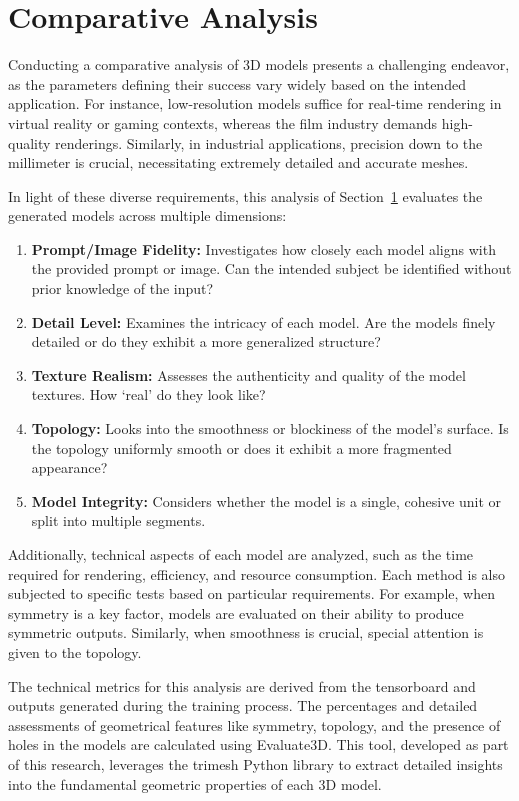 \section{Comparative Analysis}\label{comparativeAnalysis}

Conducting a comparative analysis of 3D models presents a challenging endeavor, as the parameters defining their success vary widely based on the intended application. For instance, low-resolution models suffice for real-time rendering in virtual reality or gaming contexts, whereas the film industry demands high-quality renderings. Similarly, in industrial applications, precision down to the millimeter is crucial, necessitating extremely detailed and accurate meshes.

In light of these diverse requirements, this analysis of Section~\ref{comparativeAnalysis} evaluates the generated models across multiple dimensions:

\begin{enumerate}
    \item \textbf{Prompt/Image Fidelity:} Investigates how closely each model aligns with the provided prompt or image. Can the intended subject be identified without prior knowledge of the input?
    \item \textbf{Detail Level:} Examines the intricacy of each model. Are the models finely detailed or do they exhibit a more generalized structure?
    \item \textbf{Texture Realism:} Assesses the authenticity and quality of the model textures. How `real' do they look like?
    \item \textbf{Topology:} Looks into the smoothness or blockiness of the model's surface. Is the topology uniformly smooth or does it exhibit a more fragmented appearance?
    \item \textbf{Model Integrity:} Considers whether the model is a single, cohesive unit or split into multiple segments.
\end{enumerate}

Additionally, technical aspects of each model are analyzed, such as the time required for rendering, efficiency, and resource consumption. Each method is also subjected to specific tests based on particular requirements. For example, when symmetry is a key factor, models are evaluated on their ability to produce symmetric outputs. Similarly, when smoothness is crucial, special attention is given to the topology.

The technical metrics for this analysis are derived from the tensorboard and outputs generated during the training process. The percentages and detailed assessments of geometrical features like symmetry, topology, and the presence of holes in the models are calculated using Evaluate3D. This tool, developed as part of this research, leverages the trimesh Python library \citep{trimesh} to extract detailed insights into the fundamental geometric properties of each 3D model.

